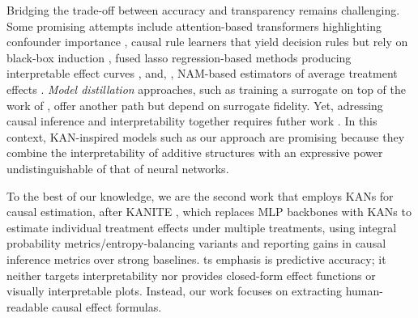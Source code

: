 Bridging the trade-off between accuracy and transparency remains challenging. Some promising attempts include attention-based transformers highlighting confounder importance \citep{zhang2023exploring}, causal rule learners that yield decision rules but rely on black-box induction \citep{wu2025newcausalrulelearning, bargaglistoffi2024causalruleensembleinterpretable}, fused lasso regression-based methods producing interpretable effect curves \citep{padilla2025causalfusedlassointerpretable}, and, , NAM-based estimators of average treatment effects \citep{chen22covariate}.  \textit{Model distillation} approaches, such as training a surrogate on top of the work of \citet{shalit2017estimating} \citep{kim2021learninginterpretablemodelscausal}, offer another path but depend on surrogate fidelity. Yet, adressing causal inference and interpretability together requires futher work \citep{moraffah20causal}. In this context, KAN-inspired models such as our approach are promising because they combine the interpretability of additive structures with an expressive power undistinguishable of that of neural networks.

To the best of our knowledge, we are the second work that employs KANs for causal estimation, after KANITE \citep{mehendale2025kanite}, which replaces MLP backbones with KANs to estimate individual treatment effects under multiple treatments, using integral probability metrics/entropy-balancing variants and reporting gains in causal inference metrics over strong baselines. ts emphasis is predictive accuracy; it neither targets interpretability nor provides closed-form effect functions or visually interpretable plots. Instead, our work focuses on extracting human-readable causal effect formulas.

